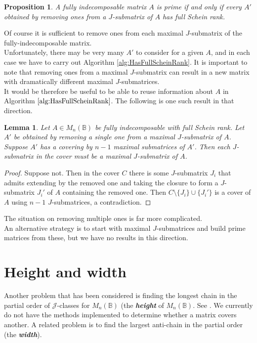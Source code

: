\documentclass[11pt]{article}
\newtheorem{prop}[thm]{Proposition}
\newtheorem{lemma}[thm]{Lemma}
\newcommand{\defn}[1]{\textbf{\textit{#1}}}
\numberwithin{equation}{section}
\newcommand{\B}{\mathbb{B}}
\newcommand{\Bn}{M_n(\B)}
\newcommand{\J}{\mathscr{J}}
\begin{document}
\begin{prop}
  A fully indecomposable matrix $A$ is prime if and only if every $A'$ obtained by removing ones from a $J$-submatrix of $A$ has full Schein rank.
\end{prop}

Of course it is sufficient to remove ones from each maximal $J$-submatrix of the fully-indecomposable matrix.\\
Unfortunately, there may be very many $A'$ to consider for a given $A$, and in each case we have to carry out Algorithm \ref{alg:HasFullScheinRank}. It is important to note that removing ones from a maximal $J$-submatrix can result in a new matrix with dramatically different maximal $J$-submatrices. \\
It would be therefore be useful to be able to reuse information about $A$ in Algorithm $\ref{alg:HasFullScheinRank}$. The following is one such result in that direction.

\begin{lemma}
  Let $A \in \Bn$ be fully indecomposable with full Schein rank. Let $A'$ be obtained by removing a single one from a maximal $J$-submatrix of $A$. Suppose $A'$ has a covering by $n-1$ maximal submatrices of $A'$. Then each $J$-submatrix in the cover must be a maximal $J$-submatrix of $A$. 
\end{lemma}
\begin{proof}
  Suppose not. Then in the cover $C$ there is some $J$-submatrix $J_i$ that admits extending by the removed one and taking the closure to form a $J$-submatrix $J_i'$ of $A$ containing the removed one. Then $C \setminus \{J_i\} \cup \{J_i'\}$ is a cover of $A$ using $n-1$ $J$-submatrices, a contradiction.
\end{proof}
The situation on removing multiple ones is far more complicated. \\
An alternative strategy is to start with maximal $J$-submatrices and build prime matrices from these, but we have no results in this direction.

\section{Height and width}
Another problem that has been considered is finding the longest chain in the
partial order of $\J$-classes for $\Bn$ (the \defn{height} of $\Bn$. 
See \cite{Breen2001}. We currently do not have the methods implemented to determine whether a matrix covers another.
A related problem is to find the largest anti-chain in the partial order
(the \defn{width}).
\end{document}
